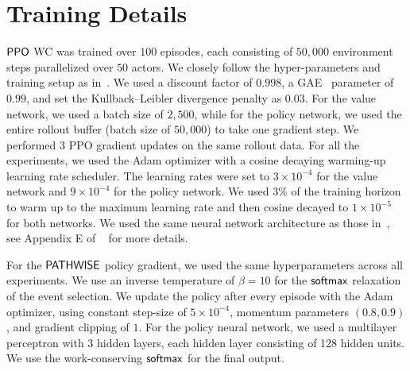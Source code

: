 \section{Training Details}
\label{sec:training-details}

$\mathsf{PPO}$ WC was trained over $100$ episodes, each consisting of $50,000$ environment steps parallelized over $50$ actors. We closely follow the hyper-parameters and training setup as in~\cite{dai2022queueing}. We used a discount factor of $0.998$, a GAE~\cite{schulman2015high} parameter of $0.99$, and set the Kullback–Leibler divergence penalty as $0.03$. For the value network, we used a batch size of $2,500$, while for the policy network, we used the entire rollout buffer (batch size of $50,000$) to take one gradient step. We performed $3$ PPO gradient updates on the same rollout data. For all the experiments, we used the Adam optimizer with a cosine decaying warming-up learning rate scheduler. The learning rates were set to $3 \times 10^{-4}$ for the value network and $9 \times 10^{-4}$ for the policy network. We used 3\% of the training horizon to warm up to the maximum learning rate and then cosine decayed to $1 \times 10^{-5}$ for both networks. We used the same neural network architecture as those in~\cite{dai2022queueing}, see Appendix E of ~\cite{dai2022queueing} for more details.

For the $\mathsf{PATHWISE}$ policy gradient, we used the same hyperparameters across all experiments. We use an inverse temperature of $\beta = 10$ for the $\mathop{\mathsf{softmax}}$ relaxation of the event selection. We update the policy after every episode with the Adam optimizer, using constant step-size of $5\times 10^{-4}$, momentum parameters $(0.8, 0.9)$, and gradient clipping of $1$. For the policy neural network, we used a multilayer perceptron with 3 hidden layers, each hidden layer consisting of 128 hidden units. We use the work-conserving $\mathop{\mathsf{softmax}}$ for the final output.



